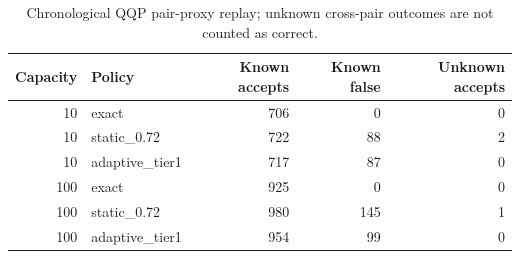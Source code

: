 \begin{table}[H]
\centering
\footnotesize
\caption{Chronological QQP pair-proxy replay; unknown cross-pair outcomes are not counted as correct.}
\label{tab:stream-proxy}
\begin{tabular}{|r|l|r|r|r|}
\hline
Capacity & Policy & Known accepts & Known false & Unknown accepts \\ \hline
10 & exact & 706 & 0 & 0 \\ \hline
10 & static\_0.72 & 722 & 88 & 2 \\ \hline
10 & adaptive\_tier1 & 717 & 87 & 0 \\ \hline
100 & exact & 925 & 0 & 0 \\ \hline
100 & static\_0.72 & 980 & 145 & 1 \\ \hline
100 & adaptive\_tier1 & 954 & 99 & 0 \\ \hline
\end{tabular}
\end{table}
